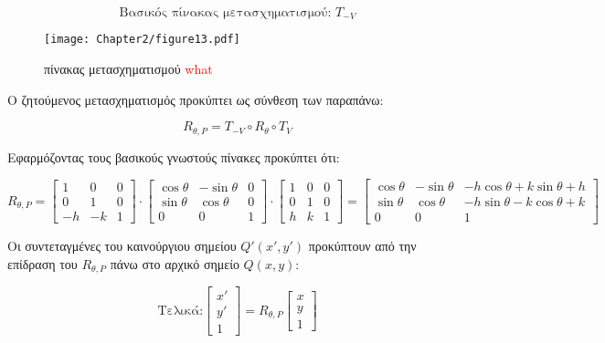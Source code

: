 \begin{solution}
\[
\text{Βασικός πίνακας μετασχηματισμού: } T_{-V}
\]

\begin{figure}[h!]
	\begin{center}
		    \texttt{[image: Chapter2/figure13.pdf]}
	\end{center}
	\caption{πίνακας μετασχηματισμού \textcolor{red}{what}}
\end{figure}


Ο ζητούμενος μετασχηματισμός προκύπτει ως σύνθεση των παραπάνω:

\[
R_{\theta,P} = T_{-V} \circ R_\theta \circ T_V
\]

Εφαρμόζοντας τους βασικούς γνωστούς πίνακες προκύπτει ότι:

\[
R_{\theta,P} =
\begin{bmatrix}
1 & 0 & 0 \\
0 & 1 & 0 \\
-h & -k & 1
\end{bmatrix}
\cdot
\begin{bmatrix}
\cos\theta & -\sin\theta & 0 \\
\sin\theta & \cos\theta & 0 \\
0 & 0 & 1
\end{bmatrix}
\cdot
\begin{bmatrix}
1 & 0 & 0 \\
0 & 1 & 0 \\
h & k & 1
\end{bmatrix}
=
\begin{bmatrix}
\cos\theta & -\sin\theta & -h\cos\theta + k\sin\theta + h \\
\sin\theta & \cos\theta & -h\sin\theta - k\cos\theta + k \\
0 & 0 & 1
\end{bmatrix}
\]

Οι συντεταγμένες του καινούργιου σημείου $Q'(x', y')$ προκύπτουν από την επίδραση του $R_{\theta,P}$ πάνω στο αρχικό σημείο $Q(x, y)$:

\[
\text{Τελικά:}
\begin{bmatrix}
x' \\ y' \\ 1
\end{bmatrix}
=
R_{\theta,P}
\begin{bmatrix}
x \\ y \\ 1
\end{bmatrix}
\]
\end{solution}